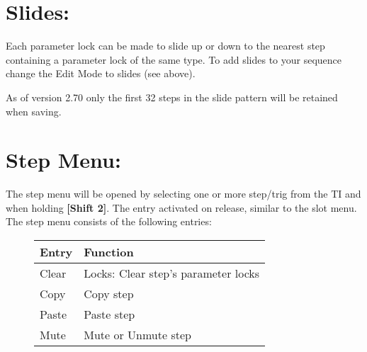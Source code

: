 \section{Slides:}
Each parameter lock can be made to slide up or down to the nearest step containing a parameter lock of the same type.
\newline
To add slides to your sequence change the Edit Mode to slides (see above).

As of version 2.70 only the first 32 steps in the slide pattern will be retained when saving.

\newpage
\section{Step Menu:}

The step menu will be opened by selecting one or more step/trig from the TI and when holding \textbf{[Shift 2]}. The entry activated on release, similar to the slot menu.
The step menu consists of the following entries:

\begin{figure}[hb]
    \begin{tabular}{|l|l|}
    \hline
    \rowcolor[HTML]{C0C0C0} 
    Entry            & Function \\ \hline
    Clear            & Locks: Clear step's parameter locks \\ \hline
    Copy         & Copy step\\ \hline
    Paste        & Paste step\\ \hline
    Mute         & Mute or Unmute step\\ \hline
    \end{tabular}
\end{figure}